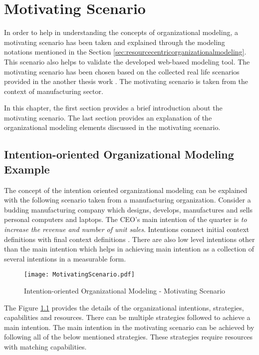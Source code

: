\chapter{Motivating Scenario}
\label{chap:motivatingScenario}
In order to help in understanding the concepts of organizational modeling, a motivating scenario has been taken and explained through the modeling notations mentioned in the Section \ref{sec:resourcecentricorganizationalmodeling}. This scenario also helps to validate the developed web-based modeling tool. The motivating scenario has been chosen based on the collected real life scenarios provided in the another thesis work \cite{Sierr2015}. The motivating scenario is taken from the context of manufacturing sector. 

In this chapter, the first section provides a brief introduction about the motivating scenario. The last section provides an explanation of the organizational modeling elements discussed in the motivating scenario. 
\section{Intention-oriented Organizational Modeling Example}
\label{sec:scenario}
The concept of the intention oriented organizational modeling can be explained with the following scenario taken from a manufacturing organization. Consider a budding manufacturing company which designs, develops, manufactures and sells personal computers and laptops. The CEO's main intention of the quarter is \textit{to increase the revenue and number of unit sales}. Intentions connect initial context definitions with final context definitions \cite{Sungur2014a}. There are also low level intentions other than the main intention which helps in achieving main intention as a collection of several intentions in a measurable form. 
 
\begin{figure}
  	\centering
  	\texttt{[image: MotivatingScenario.pdf]}
  	\caption{Intention-oriented Organizational Modeling - Motivating Scenario}
  	\label{fig:motivatingscenario}
\end{figure}
  
The Figure \ref{fig:motivatingscenario} provides the details of the organizational intentions, strategies, capabilities and resources. There can be multiple strategies followed to achieve a main intention. The main intention in the motivating scenario can be achieved by following all of the below mentioned strategies. These strategies require resources with matching capabilities.
 
